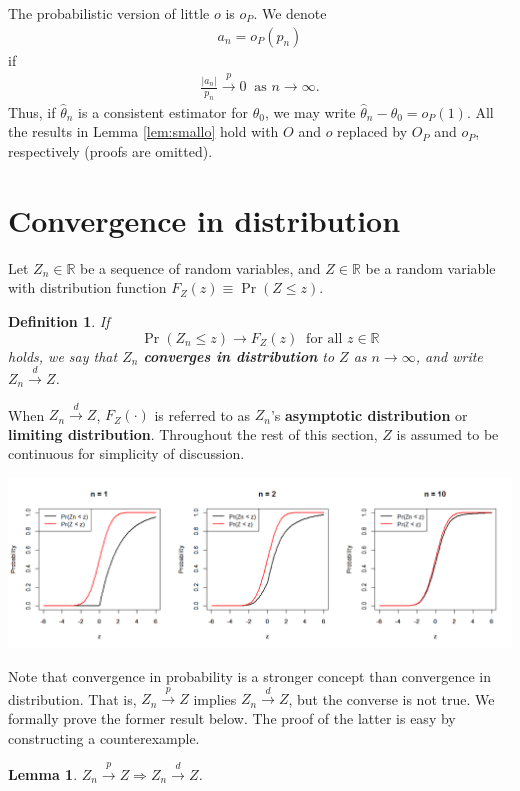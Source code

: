 \documentclass[10.5pt, A4paper, openany, uplatex]{book}
\newcommand{\mbb}{\mathbb}
\renewcommand{\hat}{\widehat}
\newtheorem{definition}[theorem]{Definition}
\newtheorem{lemma}[theorem]{Lemma}
\numberwithin{equation}{section}
\begin{document}
The probabilistic version of little $o$ is $o_P$.
We denote
\begin{align*}
	a_n = o_P(p_n)
\end{align*}
if 
\begin{align*}
	\frac{|a_n|}{p_n} \overset{p}{\to} 0 \;\; \text{as $n \to \infty$}.
\end{align*}
Thus, if $\hat \theta_n$ is a consistent estimator for $\theta_0$, we may write $\hat \theta_n - \theta_0 = o_P(1)$.
All the results in Lemma \ref{lem:smallo} hold with $O$ and $o$ replaced by $O_P$ and $o_P$, respectively (proofs are omitted).

\section{Convergence in distribution}\label{subsec:indist}

Let $Z_n \in \mbb{R}$ be a  sequence of random variables, and $Z \in \mbb{R}$ be a random variable with distribution function  $F_Z(z) \equiv \Pr(Z \le z)$.
\begin{definition}
If
\[
	\Pr(Z_n \le z) \to F_Z(z) \;\; \text{for all $z \in \mbb{R}$}
\]
holds, we say that $Z_n$ \textbf{converges in distribution} to $Z$ as $n \to \infty$, and write $Z_n \overset{d}{\to} Z$.
\end{definition}
When $Z_n \overset{d}{\to} Z$, $F_Z(\cdot)$ is referred to as $Z_n$'s \textbf{asymptotic distribution} or \textbf{limiting distribution}.
Throughout the rest of this section, $Z$ is assumed to be continuous for simplicity of discussion.

\begin{center}
		\includegraphics[width = 16cm]{probconv.png}
\end{center}


Note that convergence in probability is a stronger concept than convergence in distribution.
That is, $Z_n \overset{p}{\to} Z$ implies $Z_n \overset{d}{\to} Z$, but the converse is not true.
We formally prove the former result below.
The proof of the latter is easy by constructing a counterexample.
\begin{lemma}\label{lem:p_to_d}
	$Z_n \overset{p}{\to} Z \Longrightarrow Z_n \overset{d}{\to} Z$.
\end{lemma}
\end{document}
